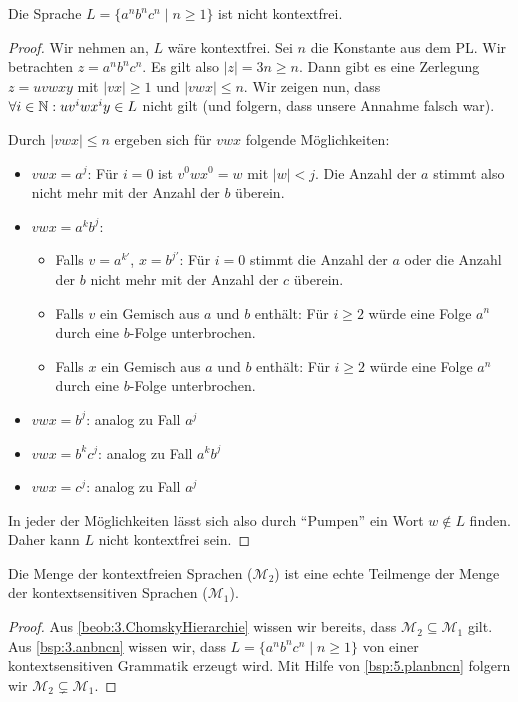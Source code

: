 \begin{lemma}\label{bsp:5.planbncn}
Die Sprache $L=\{a^nb^nc^n \mid n\geq 1\}$ ist nicht kontextfrei.
\end{lemma}
\begin{proof}
  Wir nehmen an, $L$ wäre kontextfrei.
	Sei $n$ die Konstante aus dem \ac{PL}.
	Wir betrachten $z=a^nb^nc^n$. Es gilt also $|z| = 3n \ge n$.
  Dann gibt es eine Zerlegung $z = uvwxy$ mit $|vx| \ge 1$ und $|vwx| \le n$.
  Wir zeigen nun, dass $\forall i\in\mathbb{N}: uv^iwx^iy\in L$ nicht gilt (und folgern, dass unsere Annahme falsch war).

  Durch $|vwx| \le n$ ergeben sich für $vwx$ folgende Möglichkeiten:
  \begin{itemize}
  \item $vwx = a^j$: 
    Für $i=0$ ist $v^0wx^0=w$ mit $|w| < j$.
    Die Anzahl der $a$ stimmt also nicht mehr mit der Anzahl der $b$ überein.
  \item $vwx = a^kb^j$:
    \begin{itemize}
    \item Falls $v = a^{k'}$, $x = b^{j'}$: Für $i=0$ stimmt die Anzahl der $a$ oder die Anzahl der $b$ nicht mehr mit der Anzahl der $c$ überein.
    \item Falls $v$ ein Gemisch aus $a$ und $b$ enthält:
      Für $i\ge 2$ würde eine Folge $a^n$ durch eine $b$-Folge unterbrochen.
    \item Falls $x$ ein Gemisch aus $a$ und $b$ enthält:
      Für $i \ge2$ würde eine Folge $a^n$ durch eine $b$-Folge unterbrochen.
    \end{itemize}
  \item $vwx = b^j$: analog zu Fall $a^j$
  \item $vwx = b^kc^j$: analog zu Fall $a^kb^j$
  \item $vwx = c^j$: analog zu Fall $a^j$
  \end{itemize}
  In jeder der Möglichkeiten lässt sich also durch "`Pumpen"' ein Wort $w \not \in L$ finden.
  Daher kann $L$ nicht kontextfrei sein.
\end{proof}




\begin{lemma} %

  Die Menge der kontextfreien Sprachen ($\mathcal{M}_2$) ist eine echte Teilmenge der Menge der kontextsensitiven Sprachen ($\mathcal{M}_1$).
\end{lemma}
\begin{proof}
Aus \autoref{beob:3.ChomskyHierarchie} wissen wir bereits, dass $\mathcal{M}_2 \subseteq \mathcal{M}_1$ gilt.
Aus \autoref{bsp:3.anbncn} wissen wir, dass $L=\{a^nb^nc^n \mid n\geq 1\}$ von einer kontextsensitiven Grammatik erzeugt wird.
Mit Hilfe von \autoref{bsp:5.planbncn} folgern wir $\mathcal{M}_2 \subsetneq \mathcal{M}_1$.
\end{proof}

